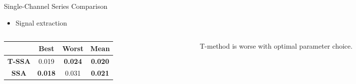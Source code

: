 \documentclass[pdf, unicode, ucs, notheorems]{beamer}
\newcommand{\bluetext}[1]{{\usebeamercolor[fg]{bluetext_color}#1}}
\theoremstyle{definition}
\begin{document}
\begin{frame}{Single-Channel Series Comparison}
  \begin{itemize}
    \item Signal extraction
  \end{itemize}
  \begin{columns}
    \begin{column}{0.65\textwidth}
      \begin{table}[ht]
        \centering
        \begin{tabular}{c|ccc}
          \hline
          & Best & Worst & Mean \\
          \hline
          \textbf{T-SSA} & \bluetext{0.019} &
          \textbf{\bluetext{0.024}} &
          \textbf{\bluetext{0.020}} \\
          \textbf{SSA} & \textbf{\bluetext{0.018}} & 0.031 &
          \textbf{\bluetext{0.021}} \\
          \hline
        \end{tabular}
      \end{table}
    \end{column}
    \begin{column}{0.35\textwidth}
      T-method is worse with optimal parameter choice.
    \end{column}
  \end{columns}
\end{frame}
\end{document}
